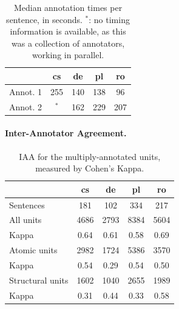 \documentclass[11pt,letterpaper]{article}
\newcommand{\XXX}[1]{{\color{red}XXX #1}} %
\newcommand{\oa}[1]{\footnote{\color{red}OA: #1}}
\begin{document}

\begin{table}[t]
\begin{center}
{\small
\begin{tabular}{l|cccc}
& cs & de & pl & ro \\
\hline
Annot. 1 & 255 & 140  & 138 & 96 \\
Annot. 2 & $^*$ & 162 & 229 & 207 \\
\end{tabular}
\caption{Median annotation times per sentence, in seconds.
  $^*$: no timing information is available, as
  this was a collection of annotators, working in parallel.}
\label{tab:annot_times}
}
\end{center}
\end{table}




\paragraph{Inter-Annotator Agreement.}
\label{sec:iaa}

\begin{table}[t]
\begin{center}
{\small
\begin{tabular}{l|cccc}
 & cs & de & pl & ro \\
\hline
Sentences & 181 & 102 & 334 & 217 \\
\hline
All units & 4686   & 2793   & 8384   & 5604  \\
Kappa & 0.64   & 0.61   & 0.58   & 0.69  \\
\hline
Atomic units & 2982 & 1724 & 5386 & 3570 \\
Kappa & 0.54 & 0.29 & 0.54 & 0.50 \\
\hline
Structural units & 1602 & 1040 & 2655 & 1989 \\
Kappa & 0.31 & 0.44 & 0.33 & 0.58 \\
\end{tabular}
\caption{IAA for the multiply-annotated units,
measured by Cohen's Kappa. }
\label{tab:iaa}
}
\end{center}
\end{table}

\end{document}
